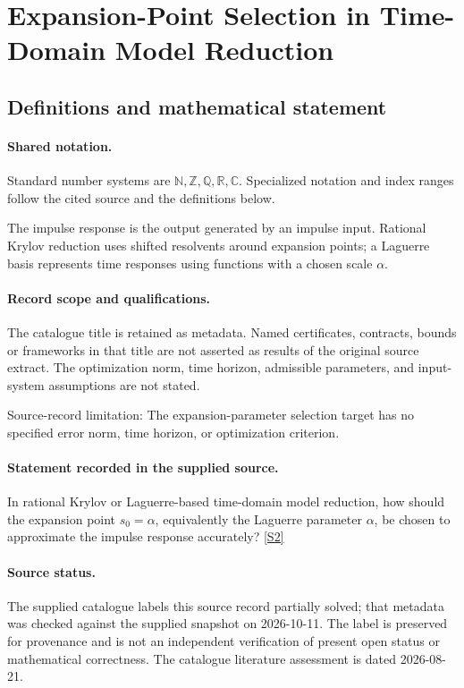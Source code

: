 \documentclass[11pt]{article}
\newcommand{\sref}[2]{\hyperlink{source:#1:#2}{[S#2]}}
\begin{document}
\section{Expansion-Point Selection in Time-Domain Model Reduction}\label{statement}

\subsection{Definitions and mathematical statement}

\paragraph{Shared notation.}Standard number systems are $\mathbb N,\mathbb Z,\mathbb Q,\mathbb R,\mathbb C$. Specialized notation and index ranges follow the cited source and the definitions below.


The impulse response is the output generated by an impulse input. Rational Krylov reduction uses shifted resolvents around expansion points; a Laguerre basis represents time responses using functions with a chosen scale $\alpha$.
\paragraph{Record scope and qualifications.}
The catalogue title is retained as metadata. Named certificates, contracts, bounds or frameworks in that title are not asserted as results of the original source extract.
The optimization norm, time horizon, admissible parameters, and input-system assumptions are not stated.

Source-record limitation: The expansion-parameter selection target has no specified error norm, time horizon, or optimization criterion.
\paragraph{Statement recorded in the supplied source.}
In rational Krylov or Laguerre-based time-domain model reduction, how should the expansion point $s_0=\alpha$, equivalently the Laguerre parameter $\alpha$, be chosen to approximate the impulse response accurately? \sref{statement}{2}
\paragraph{Source status.}
The supplied catalogue labels this source record partially solved; that metadata was checked against the supplied snapshot on 2026-10-11. The label is preserved for provenance and is not an independent verification of present open status or mathematical correctness. The catalogue literature assessment is dated 2026-08-21.
\end{document}
